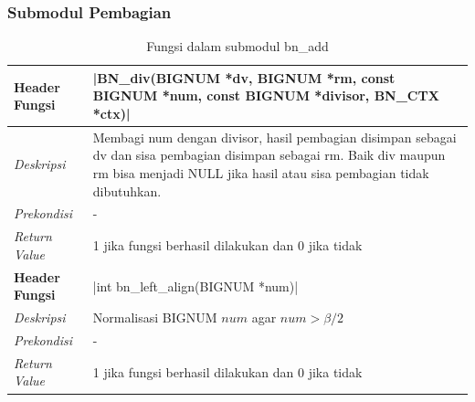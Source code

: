 \subsubsection{Submodul Pembagian}
\begin{table}[h]
  \caption{Fungsi dalam submodul bn\_add}
  \begin{tabular}{R{2.8cm}L{10.5cm}}
    \toprule
    \textbf{Header Fungsi} & |BN_div(BIGNUM *dv, BIGNUM *rm, const BIGNUM *num, const BIGNUM *divisor, BN_CTX *ctx)|                                                                                                       \\ \midrule
    \textit{Deskripsi}     & Membagi num dengan divisor, hasil pembagian disimpan sebagai dv dan sisa pembagian disimpan sebagai rm. Baik div maupun rm bisa menjadi NULL jika hasil atau sisa pembagian tidak dibutuhkan. \\
    \textit{Prekondisi}    & -                                                                                                                                                                                             \\
    \textit{Return Value}  & 1 jika fungsi berhasil dilakukan dan 0 jika tidak
    \\ \bottomrule
    \textbf{Header Fungsi} & |int bn_left_align(BIGNUM *num)|                                                                                                                                                              \\ \midrule
    \textit{Deskripsi}     & Normalisasi BIGNUM $num$ agar $num > \beta/2$                                                                                                                                                 \\
    \textit{Prekondisi}    & -                                                                                                                                                                                             \\
    \textit{Return Value}  & 1 jika fungsi berhasil dilakukan dan 0 jika tidak
    \\ \bottomrule
  \end{tabular}

\end{table}

